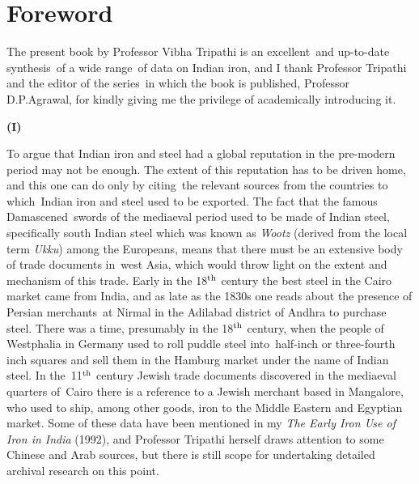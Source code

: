 \chapter*{Foreword}\label{preface}


The present book by Professor Vibha Tripathi is an excellent and up-to-date synthesis of a wide range of data on Indian iron, and I thank Professor Tripathi and the editor of the series in which the book is published, Professor D.P.Agrawal, for kindly giving me the privilege of academically introducing it.

\vspace{-.3cm}

\begin{center}{\textbf{(I)}}\end{center}

\vspace{-.3cm}

To argue that Indian iron and steel had a global reputation in the pre-modern period may not be enough. The extent of this reputation has to be driven home, and this one can do only by citing the relevant sources from the countries to which Indian iron and steel used to be exported. The fact that the famous Damascened swords of the mediaeval period used to be made of Indian steel, specifically south Indian steel which was known as \textit{Wootz} (derived from the local term \textit{Ukku}) among the Europeans, means that there must be an extensive body of trade documents in west Asia, which would throw light on the extent and mechanism of this trade. Early in the 18$^{\rm th}$ century the best steel in the Cairo market came from India, and as late as the 1830s one reads about the presence of Persian merchants at Nirmal in the Adilabad district of Andhra to purchase steel. There was a time, presumably in the 18$^{\rm th}$ century, when the people of Westphalia in Germany used to roll puddle steel into half-inch or three-fourth inch squares and sell them in the Hamburg market under the name of Indian steel. In the 11$^{\rm th}$ century Jewish trade documents discovered in the mediaeval quarters of Cairo there is a reference to a Jewish merchant based in Mangalore, who used to ship, among other goods, iron to the Middle Eastern and Egyptian market. Some of these data have been mentioned in my \textit{The Early Iron Use of Iron in India} (1992), and Professor Tripathi herself draws attention to some Chinese and Arab sources, but there is still scope for undertaking detailed archival research on this point. 

